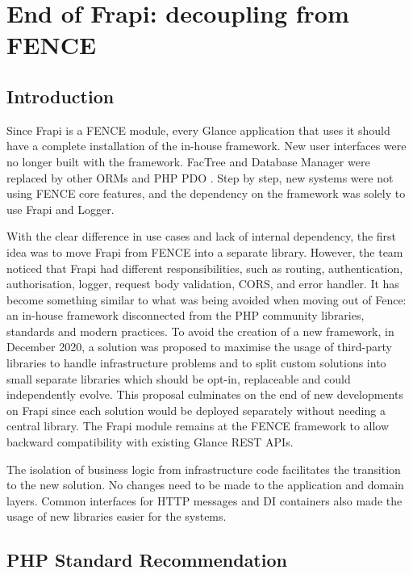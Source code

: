 \chapter{End of Frapi: decoupling from FENCE}
\label{chap5}

\section{Introduction}

Since Frapi is a FENCE module, every Glance application that uses it should have a complete installation of the in-house framework. New user interfaces were no longer built with the framework. FacTree and Database Manager were replaced by other ORMs and PHP PDO \cite{php-pdo-doc}. Step by step, new systems were not using FENCE core features, and the dependency on the framework was solely to use Frapi and Logger.

With the clear difference in use cases and lack of internal dependency, the first idea was to move Frapi from FENCE into a separate library. However, the team noticed that Frapi had different responsibilities, such as routing, authentication, authorisation, logger, request body validation, CORS, and error handler. It has become something similar to what was being avoided when moving out of Fence: an in-house framework disconnected from the PHP community libraries, standards and modern practices. To avoid the creation of a new framework, in December 2020, a solution was proposed to maximise the usage of third-party libraries to handle infrastructure problems and to split custom solutions into small separate libraries which should be opt-in, replaceable and could independently evolve. This proposal culminates on the end of new developments on Frapi since each solution would be deployed separately without needing a central library. The Frapi module remains at the FENCE framework to allow backward compatibility with existing Glance REST APIs.

The isolation of business logic from infrastructure code facilitates the transition to the new solution. No changes need to be made to the application and domain layers. Common interfaces for HTTP messages and DI containers also made the usage of new libraries easier for the systems.

\section{PHP Standard Recommendation}

